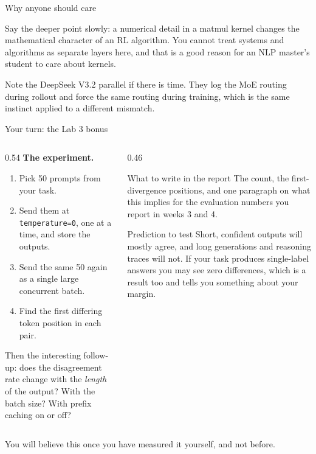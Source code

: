 \documentclass[aspectratio=169,10pt]{beamer}
\begin{document}
\begin{frame}[shrink=7]{Why anyone should care}
{  Say the deeper point slowly: a numerical detail in a matmul kernel changes
  the mathematical character of an RL algorithm. You cannot treat systems and
  algorithms as separate layers here, and that is a good reason for an NLP
  master's student to care about kernels.

  Note the DeepSeek V3.2 parallel if there is time. They log the MoE routing
  during rollout and force the same routing during training, which is the same
  instinct applied to a different mismatch.}
\end{frame}

\begin{frame}{Your turn: the Lab 3 bonus}
  \begin{columns}[T]
    \begin{column}{0.54\textwidth}
      \textbf{The experiment.}
      \begin{enumerate}\small
        \item Pick 50 prompts from your task.
        \item Send them at \texttt{temperature=0}, one at a time, and store the
          outputs.
        \item Send the same 50 again as a single large concurrent batch.
        \item {} Find the first differing token
          position in each pair.
      \end{enumerate}
      \vspace{0.5em}
      \small
      Then the interesting follow-up: does the disagreement rate change with
      the \emph{length} of the output? With the batch size? With prefix
      caching on or off?
    \end{column}
    \begin{column}{0.46\textwidth}
      \begin{block}{What to write in the report}
        \small
        The count, the first-divergence positions, and one paragraph on what
        this implies for the evaluation numbers you report in weeks 3 and 4.
      \end{block}
      \vspace{0.3em}
      \begin{block}{Prediction to test}
        \small
        Short, confident outputs will mostly agree, and long generations and
        reasoning traces will not. If your task produces single-label answers
        you may see zero differences, which is a result too and tells you
        something about your margin.
      \end{block}
    \end{column}
  \end{columns}
  \vfill
  \centering
  \small
  You will believe this once you have measured it yourself, and not before.
\end{frame}
\end{document}
